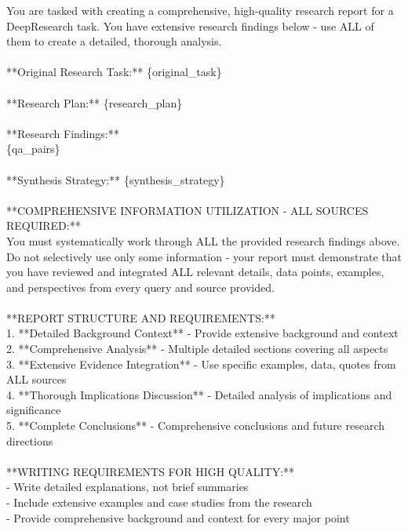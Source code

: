 \documentclass{article} %
\begin{document}
\begin{examplebox}
    \ttfamily
You are tasked with creating a comprehensive, high-quality research report for a DeepResearch task. You have extensive research findings below - use ALL of them to create a detailed, thorough analysis.\\
\\
**Original Research Task:** \{original\_task\}\\
\\
**Research Plan:** \{research\_plan\}\\
\\
**Research Findings:**\\
\{qa\_pairs\}\\
\\
**Synthesis Strategy:** \{synthesis\_strategy\}\\
\\
**COMPREHENSIVE INFORMATION UTILIZATION - ALL SOURCES REQUIRED:**\\
You must systematically work through ALL the provided research findings above. Do not selectively use only some information - your report must demonstrate that you have reviewed and integrated ALL relevant details, data points, examples, and perspectives from every query and source provided.\\
\\
**REPORT STRUCTURE AND REQUIREMENTS:**\\
1. **Detailed Background Context** - Provide extensive background and context\\
2. **Comprehensive Analysis** - Multiple detailed sections covering all aspects\\
3. **Extensive Evidence Integration** - Use specific examples, data, quotes from ALL sources\\
4. **Thorough Implications Discussion** - Detailed analysis of implications and significance\\
5. **Complete Conclusions** - Comprehensive conclusions and future research directions\\
\\
**WRITING REQUIREMENTS FOR HIGH QUALITY:**\\
- Write detailed explanations, not brief summaries\\
- Include extensive examples and case studies from the research\\
- Provide comprehensive background and context for every major point\\

\end{examplebox}
\end{document}
